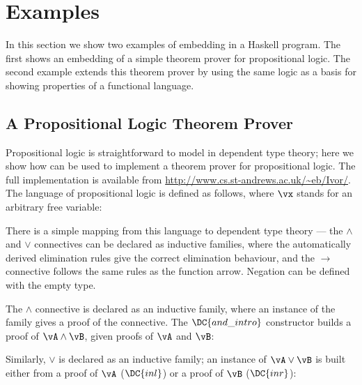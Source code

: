 \section{Examples}

In this section we show two examples of embedding \Ivor{} in a Haskell
program. The first shows an embedding of a simple theorem prover for
propositional logic. The second example extends this theorem prover by
using the same logic as a basis for showing properties of a functional
language.

\subsection{A Propositional Logic Theorem Prover}

\label{example1}

Propositional logic is straightforward to model in dependent type
theory; here we show how \Ivor{} can be used to implement a theorem
prover for propositional logic. The full implementation is available
from \url{http://www.cs.st-andrews.ac.uk/~eb/Ivor/}.  The language of
propositional logic is defined as follows, where $\vx$ stands for an
arbitrary free variable:


\newcommand{\Tand}{\TC{And}}
\newcommand{\andintro}{\DC{and\_intro}}
\newcommand{\Tor}{\TC{Or}}
\newcommand{\orintrol}{\DC{inl}}
\newcommand{\orintror}{\DC{inr}}

There is a simple mapping from this language to dependent type theory
--- the $\land$ and $\lor$ connectives can be declared as inductive
families, where the automatically derived elimination rules give the
correct elimination behaviour, and the $\to$ connective follows the
same rules as the function arrow. Negation can be defined with the
empty type.

The $\land$ connective is declared as an inductive family, where an
instance of the family gives a proof of the connective. The $\andintro$
constructor builds a proof of $\vA\land\vB$, given proofs of $\vA$ and
$\vB$:

\DM{
\AR{
\Data\:\Tand\:(\vA,\vB\Hab\Type)\Hab\Type\hg\Where\\
\hg\hg
\andintro\Hab\fbind{\va}{\vA}{\fbind{\vb}{\vB}{\Tand\:\vA\:\vB}}
}
}

Similarly, $\lor$ is declared as an inductive family; an instance of
$\vA\lor\vB$ is built either from a proof of $\vA$ ($\orintrol$) or a
proof of $\vB$ ($\orintror$):

